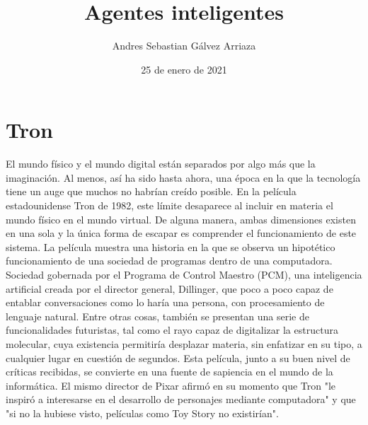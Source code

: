 \documentclass[]{scrreprt}
\title{Agentes inteligentes}
\author{Andres Sebastian Gálvez Arriaza}
\date{25 de enero de 2021}
\begin{document}
\maketitle
\section{Tron}
El mundo físico y el mundo digital están separados por algo más que la imaginación. Al menos, así ha sido hasta ahora, una época en la que la tecnología tiene un auge que muchos no habrían creído posible. En la película estadounidense Tron de 1982, este límite desaparece al incluir en materia el mundo físico en el mundo virtual. De alguna manera, ambas dimensiones existen en una sola y la única forma de escapar es comprender el funcionamiento de este sistema. 
\newline
\newline
La película muestra una historia en la que se observa un hipotético funcionamiento de una sociedad de programas dentro de una computadora. Sociedad gobernada por el Programa de Control Maestro (PCM), una inteligencia artificial creada por el director general, Dillinger, que poco a poco capaz de entablar conversaciones como lo haría una persona, con procesamiento de lenguaje natural. Entre otras cosas, también se presentan una serie de funcionalidades futuristas, tal como el rayo capaz de digitalizar la estructura molecular, cuya existencia permitiría desplazar materia, sin enfatizar en su tipo, a cualquier lugar en cuestión de segundos. Esta película, junto a su buen nivel de críticas recibidas, se convierte en una fuente de sapiencia en el mundo de la informática. El mismo director de Pixar afirmó en su momento que Tron "le inspiró a interesarse en el desarrollo de personajes mediante computadora" y que "si no la hubiese visto, películas como Toy Story no existirían".
\newline
\newline
\end{document}
